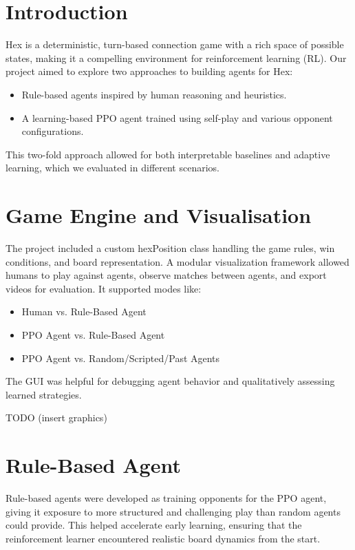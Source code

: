 \documentclass[conference]{IEEEtran}
\begin{document}
\section{Introduction}
Hex is a deterministic, turn-based connection game with a rich space of possible states, making it a compelling environment for reinforcement learning (RL). Our project aimed to explore two approaches to building agents for Hex:
\begin{itemize}[]
\item Rule-based agents inspired by human reasoning and heuristics.
\item A learning-based PPO agent trained using self-play and various opponent configurations.
\end{itemize}
This two-fold approach allowed for both interpretable baselines and adaptive learning, which we evaluated in different scenarios. 

\section{Game Engine and Visualisation}

The project included a custom hexPosition class handling the game rules, win conditions, and board representation. A modular visualization framework allowed humans to play against agents, observe matches between agents, and export videos for evaluation. It supported modes like:
\begin{itemize}[]
\item Human vs. Rule-Based Agent
\item PPO Agent vs. Rule-Based Agent
\item PPO Agent vs. Random/Scripted/Past Agents
\end{itemize}
The GUI was helpful for debugging agent behavior and qualitatively assessing learned strategies.

TODO (insert graphics)

\section{Rule-Based Agent}
Rule-based agents were developed as training opponents for the PPO agent, giving it exposure to more structured and challenging play than random agents could provide. This helped accelerate early learning, ensuring that the reinforcement learner encountered realistic board dynamics from the start.
\end{document}
